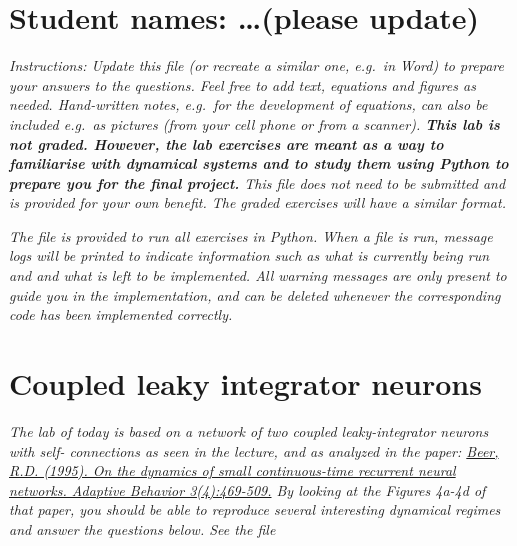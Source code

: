 \documentclass{cmc}
\begin{document}
\pagestyle{fancy}
 

\section*{Student names: \ldots (please update)}

\textit{Instructions: Update this file (or recreate a similar one, e.g.\ in
  Word) to prepare your answers to the questions. Feel free to add text,
  equations and figures as needed. Hand-written notes, e.g.\ for the development
  of equations, can also be included e.g.\ as pictures (from your cell phone or
  from a scanner).  \textbf{This lab is not graded. However, the lab exercises
    are meant as a way to familiarise with dynamical systems and to study them
    using Python to prepare you for the final project.} This file does not need
  to be submitted and is provided for your own benefit. The graded exercises
  will have a similar format.}

\textit{The file  is provided to run all exercises in Python.
  When a file is run, message logs will be printed to indicate information such
  as what is currently being run and and what is left to be implemented. All
  warning messages are only present to guide you in the implementation, and can
  be deleted whenever the corresponding code has been implemented correctly.}


\section*{Coupled leaky integrator neurons}

\textit{The lab of today is based on a network of two coupled leaky-integrator
  neurons with self- connections as seen in the lecture, and as analyzed in the
  paper:
  \href{https://journals.sagepub.com/doi/10.1177/105971239500300405}{Beer,
    R.D. (1995). On the dynamics of small continuous-time recurrent neural
    networks. Adaptive Behavior 3(4):469-509.} By looking at the Figures 4a-4d
  of that paper, you should be able to reproduce several interesting dynamical
  regimes and answer the questions below. See the file }
\end{document}
